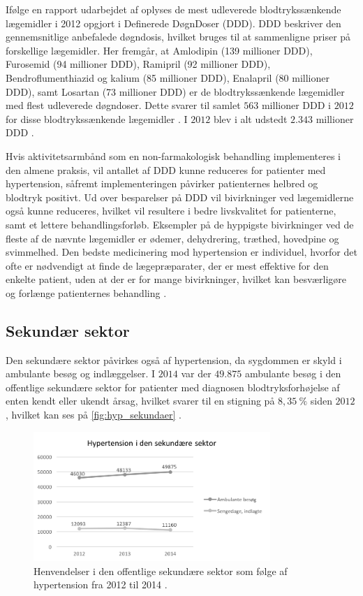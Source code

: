 Ifølge en rapport udarbejdet af \citeauthor{apotekerforeningen2012} oplyses de mest udleverede blodtrykssænkende lægemidler i 2012 opgjort i Definerede DøgnDoser (DDD).  DDD beskriver den gennemsnitlige anbefalede døgndosis, hvilket bruges til at sammenligne priser på forskellige lægemidler. Her fremgår, at Amlodipin (139 millioner DDD), Furosemid (94 millioner DDD), Ramipril (92 millioner DDD), Bendroflumenthiazid og kalium (85 millioner DDD), Enalapril (80 millioner DDD), samt Losartan (73 millioner DDD) er de blodtrykssænkende lægemidler med flest udleverede døgndoser. Dette svarer til samlet $563$ millioner DDD i $2012$ for disse blodtrykssænkende lægemidler \citep{apotekerforeningen2012}. I $2012$ blev i alt udstedt $2.343$ millioner DDD \citep{medicinoekonomi2015}. 

Hvis aktivitetsarmbånd som en non-farmakologisk  behandling implementeres i den almene praksis, vil antallet af DDD kunne reduceres for patienter med hypertension, såfremt implementeringen påvirker patienternes helbred og blodtryk positivt. Ud over besparelser på DDD vil bivirkninger ved lægemidlerne også kunne reduceres, hvilket vil resultere i bedre livskvalitet for patienterne, samt et lettere behandlingsforløb. Eksempler på de hyppigste bivirkninger ved de fleste af de nævnte lægemidler er ødemer, dehydrering, træthed, hovedpine og svimmelhed. Den bedste medicinering mod hypertension er individuel, hvorfor det ofte er nødvendigt at finde de lægepræparater, der er mest effektive for den enkelte patient, uden at der er for mange bivirkninger, hvilket kan besværligøre og forlænge patienternes behandling \citep{olsen2015}.

\subsection{Sekundær sektor}
Den sekundære sektor påvirkes også af hypertension, da sygdommen er skyld i ambulante besøg og indlæggelser. I $2014$ var der $49.875$ ambulante besøg i den offentlige sekundære sektor for patienter med diagnosen blodtryksforhøjelse af enten kendt eller ukendt årsag, hvilket svarer til en stigning på $8,35~\%$ siden $2012$, hvilket kan ses på \autoref{fig:hyp_sekundaer} \citep{sundhedsdatastyrelsen2016}. 

\begin{figure}[H]
\centering
\includegraphics[width=0.8\textwidth]{figures/hyp_sekundaer}
\caption{Henvendelser i den offentlige sekundære sektor som følge af hypertension fra 2012 til 2014 \citep{sundhedsdatastyrelsen2016}.}
\label{fig:hyp_sekundaer}
\end{figure}

